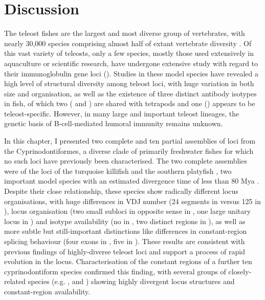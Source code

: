 \newpage

\section{Discussion}

The teleost fishes are the largest and most diverse group of vertebrates, with nearly 30,000 species comprising almost half of extant vertebrate diversity \parencite{ravi2018divergent}. Of this vast variety of teleosts, only a few species, mostly those used extensively in aquaculture or scientific research, have undergone extensive study with regard to their immunoglobulin gene loci (). Studies in these model species have revealed a high level of structural diversity among teleost \igh{} loci, with huge variation in both size and organisation, as well as the existence of three distinct antibody isotypes in fish, of which two ( and ) are shared with tetrapods and one () appears to be teleost-specific. However, in many large and important teleost lineages, the genetic basis of B-cell-mediated humoral immunity remains unknown.

In this chapter, I presented two complete and ten partial assemblies of \igh{} loci from the Cyprinodontiformes, a diverse clade of primarily freshwater fishes for which no such loci have previously been characterised. The two complete assemblies were of the \igh{} loci of the turquoise killifish \nfu and the southern platyfish \xma, two important model species with an estimated divergence time of less than 80 Mya \parencite{hughes2018teleostphylo}. Despite their close relationship, these species show radically different locus organisations, with huge differences in VDJ number (24 \vh segments in \Nfu versus 125 in \Xma), locus organisation (two small subloci in opposite sense in \Nfu, one large unitary locus in \Xma) and isotype availability (no  in \Nfu, two distinct  regions in \Xma), as well as more subtle but still-important distinctions like differences in constant-region splicing behaviour (four exons in \Nfu {}, five in \Xma). These results are consistent with previous findings of highly-diverse teleost loci and support a process of rapid evolution in the \igh{} locus. Characterisation of the constant regions of a further ten cyprinodontiform species confirmed this finding, with several groups of closely-related species (e.g. \nfu,  and ) showing highly divergent locus structures and constant-region availability.

